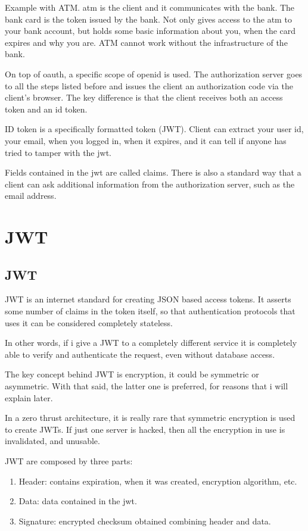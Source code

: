 \documentclass[11pt]{style}
\begin{document}
Example with ATM. atm is the client and it communicates with the bank. The bank
card is the token issued by the bank. Not only gives access to the atm to your
bank account, but holds some basic information about you, when the card expires
and why you are.
ATM cannot work without the infrastructure of the bank.

On top of oauth, a specific scope of openid is used. The authorization server
goes to all the steps listed before and issues the client an authorization code
via the client's browser.
The key difference is that the client receives both an access token and an id
token.

ID token is a specifically formatted token (JWT). Client can extract your user
id, your email, when you logged in, when it expires, and it can tell if anyone
has tried to tamper with the jwt.

Fields contained in the jwt are called claims.
There is also a standard way that a client can ask additional information from the
authorization server, such as the email address.
\section{JWT}
\label{jwt}
\subsection{JWT}
JWT is an internet standard for creating JSON based access tokens. It asserts
some number of claims in the token itself, so that authentication protocols that
uses it can be considered completely stateless.

In other words, if i give a JWT to a completely different service
it is completely able to verify and authenticate the request, even without
database access.

The key concept behind JWT is encryption, it could be symmetric or asymmetric.
With that said, the latter one is preferred, for reasons that i will explain
later.

In a zero thrust architecture, it is really rare that symmetric encryption is
used to create JWTs. If just one server is hacked, then all the encryption in
use is invalidated, and unusable.

JWT are composed by three  parts:

\begin{enumerate}
    \item Header: contains expiration, when it was created, encryption
        algorithm, etc.
    \item Data: data contained in the jwt.
    \item Signature: encrypted checksum obtained combining header and data.
\end{enumerate}
\end{document}
